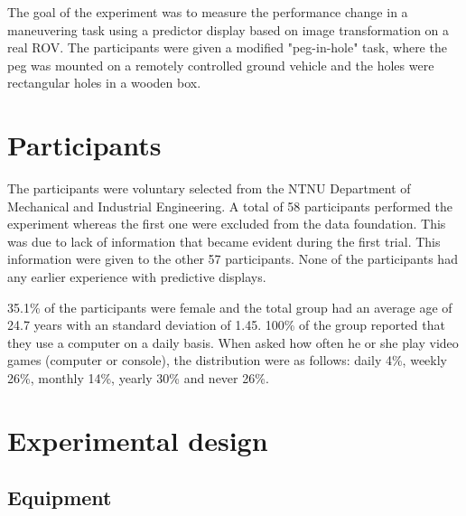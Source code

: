 The goal of the experiment was to measure the performance change in a maneuvering task using a predictor display based on image transformation on a real ROV. The participants were given a modified "peg-in-hole" task, where the peg was mounted on a remotely controlled ground vehicle and the holes were rectangular holes in a wooden box.


\section{Participants}

The participants were voluntary selected from the NTNU Department of Mechanical and Industrial Engineering. A total of 58 participants performed the experiment whereas the first one were excluded from the data foundation. This was due to lack of information that became evident during the first trial. This information were given to the other 57 participants. None of the participants had any earlier experience with predictive displays.

35.1\% of the participants were female and the total group had an average age of 24.7 years with an standard deviation of 1.45. 100\% of the group reported that they use a computer on a daily basis. When asked how often he or she play video games (computer or console), the distribution were as follows: daily 4\%, weekly 26\%, monthly 14\%, yearly 30\% and never 26\%.

\section{Experimental design}

\subsection{Equipment}

